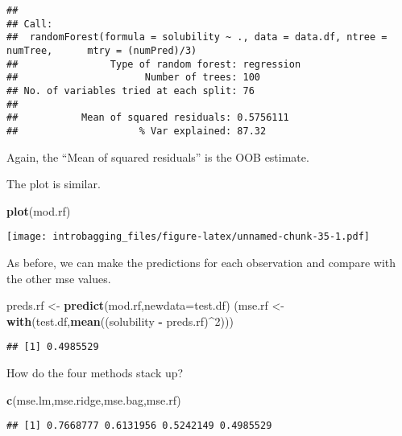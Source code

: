 \documentclass[]{article}
\newenvironment{Shaded}{\begin{snugshade}}{\end{snugshade}}
\newcommand{\DataTypeTok}[1]{\textcolor[rgb]{0.13,0.29,0.53}{#1}}
\newcommand{\DecValTok}[1]{\textcolor[rgb]{0.00,0.00,0.81}{#1}}
\newcommand{\KeywordTok}[1]{\textcolor[rgb]{0.13,0.29,0.53}{\textbf{#1}}}
\newcommand{\NormalTok}[1]{#1}
\newcommand{\OperatorTok}[1]{\textcolor[rgb]{0.81,0.36,0.00}{\textbf{#1}}}
\newcommand{\StringTok}[1]{\textcolor[rgb]{0.31,0.60,0.02}{#1}}
\begin{document}
\begin{verbatim}
## 
## Call:
##  randomForest(formula = solubility ~ ., data = data.df, ntree = numTree,      mtry = (numPred)/3) 
##                Type of random forest: regression
##                      Number of trees: 100
## No. of variables tried at each split: 76
## 
##           Mean of squared residuals: 0.5756111
##                     % Var explained: 87.32
\end{verbatim}

Again, the ``Mean of squared residuals'' is the OOB estimate.

The plot is similar.

\begin{Shaded}
\begin{Highlighting}[]
\KeywordTok{plot}\NormalTok{(mod.rf)}
\end{Highlighting}
\end{Shaded}

\texttt{[image: introbagging\_files/figure-latex/unnamed-chunk-35-1.pdf]}

As before, we can make the predictions for each observation and compare
with the other mse values.

\begin{Shaded}
\begin{Highlighting}[]
\NormalTok{preds.rf <-}\StringTok{ }\KeywordTok{predict}\NormalTok{(mod.rf,}\DataTypeTok{newdata=}\NormalTok{test.df)}
\NormalTok{(mse.rf <-}\StringTok{ }\KeywordTok{with}\NormalTok{(test.df,}\KeywordTok{mean}\NormalTok{((solubility }\OperatorTok{-}\StringTok{ }\NormalTok{preds.rf)}\OperatorTok{^}\DecValTok{2}\NormalTok{)))}
\end{Highlighting}
\end{Shaded}

\begin{verbatim}
## [1] 0.4985529
\end{verbatim}

How do the four methods stack up?

\begin{Shaded}
\begin{Highlighting}[]
\KeywordTok{c}\NormalTok{(mse.lm,mse.ridge,mse.bag,mse.rf)}
\end{Highlighting}
\end{Shaded}

\begin{verbatim}
## [1] 0.7668777 0.6131956 0.5242149 0.4985529
\end{verbatim}
\end{document}
